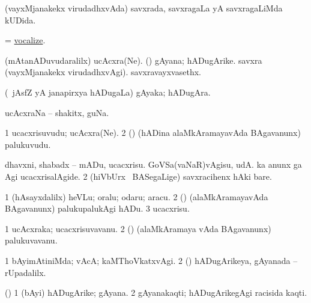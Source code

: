 \bentry 
{} 
\gl{\gu}
\expl{}
\bmng
 (vayxMjanakekx virudadhxvAda) savxrada, savxragaLa yA savxragaLiMda kUDida. 
\emng
\eentry

\bentry
{} 
\gl{\kirx}
\expl{}
\bmng
 = \hyperlink{vocalize}{vocalize}. 
\emng
\eentry

\bentry 
{} 
\gl{\nA}
\expl{}
\bmng
\bnum
{} 
\banum
{} (mAtanADuvudaralilx) ucAcxra(Ne). 
 (\saM) gAyana; hADugArike. 
\eanum
\numie
{} 
\banum
{} savxra (vayxMjanakekx virudadhxvAgi). 
 savxravayxvasethx. 
\eanum
\numie
\enum
\emng
\eentry

\bentry
{} 
\gl{\nA}
\expl{}
\bmng
 (\kanmu\ jAsfZ yA janapirxya hADugaLa) gAyaka; hADugAra. 
\emng
\eentry

\bentry 
{} 
\gl{\nA}
\expl{}
\bmng
 ucAcxraNa -- shakitx, guNa. 
\emng
\eentry

\bentry 
{} 
\gl{\nA}
\expl{}
\bmng
\bnum
\num{1} ucacxrisuvudu; ucAcxra(Ne). 
\num{2} (\saM) (hADina alaMkAramayavAda BAgavanunx) palukuvudu. 
\enum
\emng
\eentry

\bentry
{} 
\gl{\sakirx}
\expl{}
\bmng
\bnum
{} 
\banum
{} dhavxni, shabadx -- mADu, ucacxrisu. 
 GoVSa(vaNaR)vAgisu, udA.  ka anunx ga Agi ucacxrisalAgide. 
\eanum
\numie
\num{2} (hiVbUrx \mo\ BASegaLige) savxracihenx hAki bare. 
\enum
\emng

\noindent 
\gl{\akirx}
\expl{}
\bmng
\bnum
\num{1} (hAsayxdalilx) heVLu; oralu; odaru; aracu. 
\num{2} (\saM) (alaMkAramayavAda BAgavanunx) palukupalukAgi hADu. 
\num{3} ucacxrisu. 
\enum
\emng
\eentry

\bentry
{} 
\gl{\nA}
\expl{}
\bmng
\bnum
\num{1} ucAcxraka; ucacxrisuvavanu. 
\num{2} (\saM) (alaMkAramaya vAda BAgavanunx) palukuvavanu. 
\enum
\emng
\eentry

\bentry
{} 
\gl{\kirxvi}
\expl{}
\bmng
\bnum
\num{1} bAyimAtiniMda; vAcA; kaMThoVkatxvAgi. 
\num{2} (\saM) hADugArikeya, gAyanada -- rUpadalilx. 
\enum
\emng
\eentry

\bentry
{}
\gl{\nA}
\expl{}
\bmng
 (\saM) 
\bnum
\num{1} (bAyi) hADugArike; gAyana. 
\num{2} gAyanakaqti; hADugArikegAgi racisida kaqti. 
\enum
\emng
\eentry

